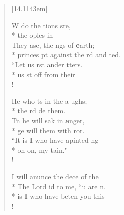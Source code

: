 \begin{flushleft}
\begin{verse}[14.1143em]

 W do the tions sre,\\*
 the oples  in \\
 They ase, the ngs of  \textbf{e}arth;\\*
princes pt against the rd and  ted.\\
 ``Let us rst ander  tters.\\*
 us st off from  their \\!

 He who ts in the a ughs;\\*
the rd de   them.\\
 Tn he will sak in  \textbf{a}nger,\\*
 ge will  them with ror.\\
 ``It is \textbf{I} who have apinted  ng\\*
on on, my  tain."\\!

 I will anunce the dece of the \flagflex{\dag}\\*
The Lord id to me, ``u are  n.\\*
 is \textbf{I} who have beten you this \\!


\end{verse}
\end{flushleft}
